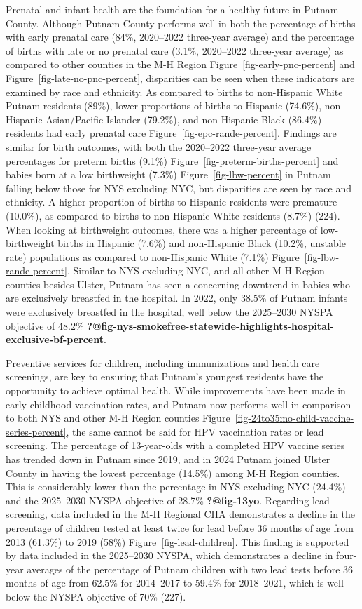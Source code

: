 \documentclass[
  english,
  letterpaper,
]{report}
\begin{document}
Prenatal and infant health are the foundation for a healthy future in
Putnam County. Although Putnam County performs well in both the
percentage of births with early prenatal care (84\%, 2020--2022
three-year average) and the percentage of births with late or no
prenatal care (3.1\%, 2020--2022 three-year average) as compared to
other counties in the M-H Region Figure~\ref{fig-early-pnc-percent} and
Figure~\ref{fig-late-no-pnc-percent}, disparities can be seen when these
indicators are examined by race and ethnicity. As compared to births to
non-Hispanic White Putnam residents (89\%), lower proportions of births
to Hispanic (74.6\%), non-Hispanic Asian/Pacific Islander (79.2\%), and
non-Hispanic Black (86.4\%) residents had early prenatal care
Figure~\ref{fig-epc-rande-percent}. Findings are similar for birth
outcomes, with both the 2020--2022 three-year average percentages for
preterm births (9.1\%) Figure~\ref{fig-preterm-births-percent} and
babies born at a low birthweight (7.3\%) Figure~\ref{fig-lbw-percent} in
Putnam falling below those for NYS excluding NYC, but disparities are
seen by race and ethnicity. A higher proportion of births to Hispanic
residents were premature (10.0\%), as compared to births to non-Hispanic
White residents (8.7\%) (224). When looking at birthweight outcomes,
there was a higher percentage of low-birthweight births in Hispanic
(7.6\%) and non-Hispanic Black (10.2\%, unstable rate) populations as
compared to non-Hispanic White (7.1\%)
Figure~\ref{fig-lbw-rande-percent}. Similar to NYS excluding NYC, and
all other M-H Region counties besides Ulster, Putnam has seen a
concerning downtrend in babies who are exclusively breastfed in the
hospital. In 2022, only 38.5\% of Putnam infants were exclusively
breastfed in the hospital, well below the 2025--2030 NYSPA objective of
48.2\%
\textbf{?@fig-nys-smokefree-statewide-highlights-hospital-exclusive-bf-percent}.

Preventive services for children, including immunizations and health
care screenings, are key to ensuring that Putnam's youngest residents
have the opportunity to achieve optimal health. While improvements have
been made in early childhood vaccination rates, and Putnam now performs
well in comparison to both NYS and other M-H Region counties
Figure~\ref{fig-24to35mo-child-vaccine-series-percent}, the same cannot
be said for HPV vaccination rates or lead screening. The percentage of
13-year-olds with a completed HPV vaccine series has trended down in
Putnam since 2019, and in 2024 Putnam joined Ulster County in having the
lowest percentage (14.5\%) among M-H Region counties. This is
considerably lower than the percentage in NYS excluding NYC (24.4\%) and
the 2025--2030 NYSPA objective of 28.7\% \textbf{?@fig-13yo}. Regarding
lead screening, data included in the M-H Regional CHA demonstrates a
decline in the percentage of children tested at least twice for lead
before 36 months of age from 2013 (61.3\%) to 2019 (58\%)
Figure~\ref{fig-lead-children}. This finding is supported by data
included in the 2025--2030 NYSPA, which demonstrates a decline in
four-year averages of the percentage of Putnam children with two lead
tests before 36 months of age from 62.5\% for 2014--2017 to 59.4\% for
2018--2021, which is well below the NYSPA objective of 70\% (227).
\end{document}
